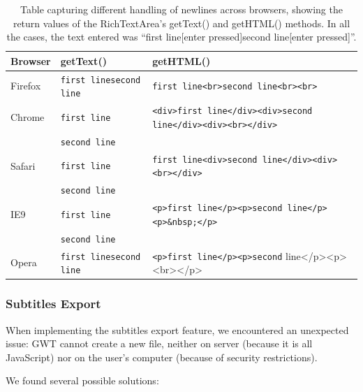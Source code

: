 \begin{table}[h]
\smaller
\begin{center}
\begin{tabular}{|l|l|l|}
\hline
\textbf{Browser} & \textbf{getText()}             & \textbf{getHTML()} \\
\hline
Firefox & \verb=first linesecond line= & \verb=first line<br>second line<br><br>= \\
\hline
Chrome  & \verb=first line=            & \verb=<div>first line</div><div>second line</div><div><br></div>= \\
        & \verb=second line=           & \\ 
\hline
Safari  & \verb=first line=            & \verb=first line<div>second line</div><div><br></div>= \\
        & \verb=second line=           & \\
\hline
IE9     & \verb=first line=            & \verb=<p>first line</p><p>second line</p><p>&nbsp;</p>= \\
        & \verb=second line=           & \\
\hline
Opera   & \verb=first linesecond line= & \verb=<p>first line</p><p>second= line</p><p><br></p> \\
\hline
\end{tabular}
\end{center}
\caption{Table capturing different handling of newlines across browsers, showing the return values of the RichTextArea's getText() and getHTML() methods. In all the cases, the text entered was ``first line[enter pressed]second line[enter pressed]''.}\label{implprocess:RichTextAreaNewlines}
\end{table}

\subsubsection{Subtitles Export}

When implementing the subtitles export feature, we encountered an unexpected issue:
GWT cannot create a new file, neither on server (because it is all JavaScript) nor on the user's computer (because of security restrictions).

We found several possible solutions:

